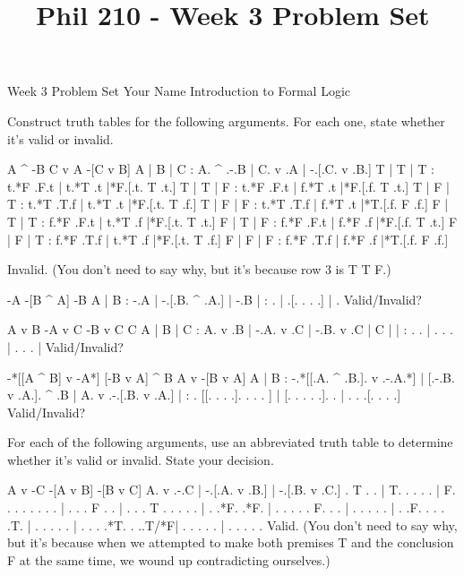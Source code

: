 
\title{Phil 210 - Week 3 Problem Set}

\heading
Week 3 Problem Set
Your Name
Introduction to Formal Logic
\endheading

Construct truth tables for the following arguments. For each one, state whether it's valid or invalid.

\problems
{}
\argument
 A ^ -B
 C v A
\argumentline
 -[C v B]
\endargument
	\answer
	\truthtable
	 A | B | C : A. ^ .-.B | C. v .A | -.[.C. v .B.]
	\truthtableline
	 T | T | T : t.*F .F.t | t.*T .t |*F.[.t. T .t.]
	 T | T | F : t.*F .F.t | f.*T .t |*F.[.f. T .t.]
	 T | F | T : t.*T .T.f | t.*T .t |*F.[.t. T .f.]
	 T | F | F : t.*T .T.f | f.*T .t |*T.[.f. F .f.]
	 F | T | T : f.*F .F.t | t.*T .f |*F.[.t. T .t.]
	 F | T | F : f.*F .F.t | f.*F .f |*F.[.f. T .t.]
	 F | F | T : f.*F .T.f | t.*T .f |*F.[.t. T .f.]
	 F | F | F : f.*F .T.f | f.*F .f |*T.[.f. F .f.]
	\endtruthtable

	Invalid. (You don't need to say why, but it's because row 3 is T T F.)
	\endanswer

\argument
 -A
 -[B ^ A]
\argumentline
 -B
\endargument
	\answer
	\truthtable
	 A | B : -.A | -.[.B. ^ .A.] | -.B
	\truthtableline
	   |   :  .  |  .[. .   . .] |  . 
	\endtruthtable
	Valid/Invalid?
	\endanswer

\argument
 A v B
 -A v C
 -B v C
\argumentline
 C
\endargument
	\answer
	\truthtable
	 A | B | C : A. v .B | -.A. v .C | -.B. v .C | C
	\truthtableline
	   |   |   :  .   .  |  . .   .  |  . .   .  |  
	\endtruthtable
	Valid/Invalid?
	\endanswer

\argument
 -*[[A ^ B] v -A*]
 [-B v A] ^ B
\argumentline
 A v -[B v A]
\endargument
	\answer
	\truthtable
	 A | B : -.*[[.A. ^ .B.]. v .-.A.*] | [.-.B. v .A.]. ^ .B | A. v .-.[.B. v .A.]
	\truthtableline
	   |   :  . [[. .   . .].   . . . ] | [. . .   . .].   .  |  .   . .[. .   . .]
	\endtruthtable
	Valid/Invalid?
	\endanswer
\endproblems

For each of the following arguments, use an abbreviated truth table to determine whether it's valid or invalid. State your decision.

\problems
{}
\argument
 A v -C
 -[A v B]
\argumentline
 -[B v C]
\endargument
	\answer
	\truthtable
	 A. v .-.C | -.[.A. v .B.] | -.[.B. v .C.]
	\truthtableline
	  . T . .  | T. . .   . .  | F. . .   . .
	  .   . .  |  . . . F . .  |  . . . T . .
	  .   . .  |  . .*F.  .*F. |  . . .   . .
	 F.   . .  |  . . .   . .  |  . .F.   . .
	  .   .T.  |  . . .   . .  |  . . .   .*T.
	  .  ..T/*F|  . . .   . .  |  . . .   . .
	\endtruthtable
	Valid. (You don't need to say why, but it's because when we attempted to make both premises T and the conclusion F at the same time, we wound up contradicting ourselves.)
	\endanswer

